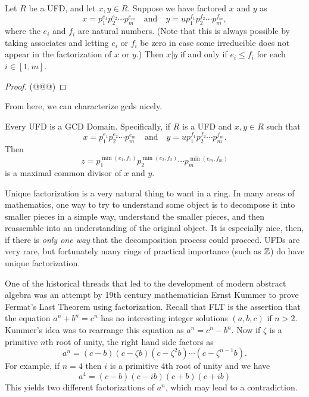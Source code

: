 \begin{prop} \label{prop:divisibility-in-a-ufd}
Let \(R\) be a UFD, and let \(x, y \in R\).
Suppose we have factored \(x\) and \(y\) as \[ x = p_1^{e_1} p_2^{e_2} \cdots p_m^{e_m} \quad \mathrm{and} \quad y = up_1^{f_1} p_2^{f_2} \cdots p_m^{f_m}, \] where the \(e_i\) and \(f_i\) are natural numbers.
(Note that this is always possible by taking associates and letting \(e_i\) or \(f_i\) be zero in case some irreducible does not appear in the factorization of \(x\) or \(y\).) Then \(x|y\) if and only if \(e_i \leq f_i\) for each \(i \in [1,m]\).
\end{prop}

\begin{proof}
(@@@)
\end{proof}

From here, we can characterize gcds nicely.

\begin{prop} \label{prop:ufd-implies-gcd-domain}
Every UFD is a GCD Domain.
Specifically, if \(R\) is a UFD and \(x, y \in R\) such that \[ x = p_1^{e_1} p_2^{e_2} \cdots p_m^{e_m} \quad \mathrm{and} \quad y = up_1^{f_1} p_2^{f_2} \cdots p_m^{f_m}. \] Then \[ z = p_1^{\min(e_1,f_1)} p_2^{\min(e_2,f_2)} \cdots p_m^{\min(e_m,f_m)} \] is a maximal common divisor of \(x\) and \(y\).
\end{prop}

Unique factorization is a very natural thing to want in a ring.
In many areas of mathematics, one way to try to understand some object is to decompose it into smaller pieces in a simple way, understand the smaller pieces, and then reassemble into an understanding of the original object.
It is especially nice, then, if there is \emph{only one way} that the decomposition process could proceed.
UFDs are very rare, but fortunately many rings of practical importance (such as \(\mathbb{Z}\)) do have unique factorization.

One of the historical threads that led to the development of modern abstract algebra was an attempt by 19th century mathematician Ernst Kummer to prove Fermat's Last Theorem using factorization.
Recall that FLT is the assertion that the equation \(a^n + b^n = c^n\) has no interesting integer solutions \((a,b,c)\) if \(n > 2\).
Kummer's idea was to rearrange this equation as \(a^n = c^n - b^n\).
Now if \(\zeta\) is a primitive \(n\)th root of unity, the right hand side factors as \[ a^n = (c - b)(c - \zeta b)(c - \zeta^2 b) \cdots (c - \zeta^{n-1} b). \] For example, if \(n = 4\) then \(i\) is a primitive 4th root of unity and we have \[ a^4 = (c - b)(c - ib)(c + b)(c + ib) \] This yields two different factorizations of \(a^n\), which may lead to a contradiction.

